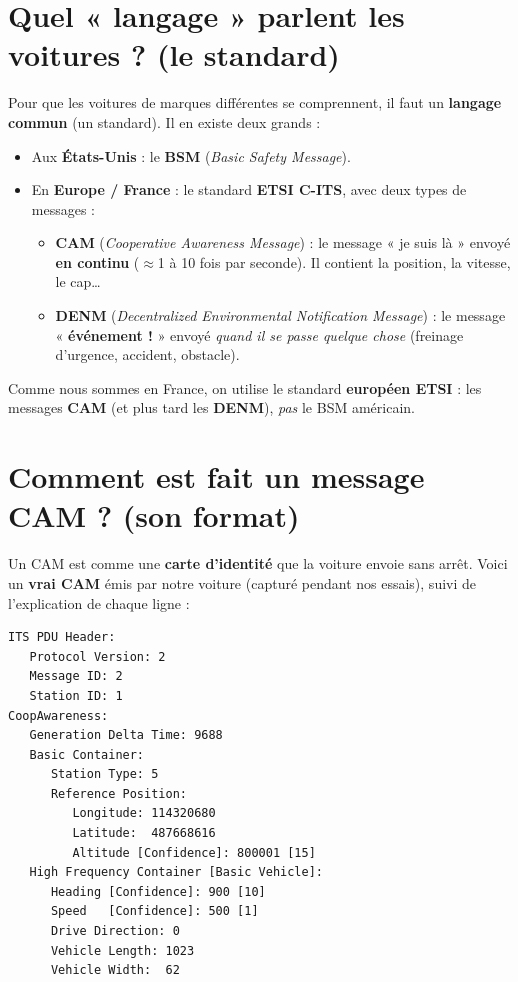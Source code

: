 \documentclass[a4paper,11pt]{article}
\begin{document}
\section{Quel « langage » parlent les voitures ? (le standard)}
Pour que les voitures de marques différentes se comprennent, il faut un
\textbf{langage commun} (un standard). Il en existe deux grands :
\begin{itemize}[leftmargin=1.4em]
  \item Aux \textbf{États-Unis} : le \textbf{BSM} (\emph{Basic Safety Message}).
  \item En \textbf{Europe / France} : le standard \textbf{ETSI C-ITS}, avec deux
        types de messages :
        \begin{itemize}[nosep]
          \item \textbf{CAM} (\emph{Cooperative Awareness Message}) : le message
                « je suis là » envoyé \textbf{en continu} ($\approx$1 à 10 fois par
                seconde). Il contient la position, la vitesse, le cap\ldots
          \item \textbf{DENM} (\emph{Decentralized Environmental Notification
                Message}) : le message « \textbf{événement !} » envoyé \emph{quand
                il se passe quelque chose} (freinage d'urgence, accident, obstacle).
        \end{itemize}
\end{itemize}

\begin{cle}
Comme nous sommes en France, on utilise le standard \textbf{européen ETSI} :
les messages \textbf{CAM} (et plus tard les \textbf{DENM}), \emph{pas} le BSM
américain.
\end{cle}

\section{Comment est fait un message CAM ? (son format)}
Un CAM est comme une \textbf{carte d'identité} que la voiture envoie sans arrêt.
Voici un \textbf{vrai CAM} émis par notre voiture (capturé pendant nos essais),
suivi de l'explication de chaque ligne :

\begin{lstlisting}
ITS PDU Header:
   Protocol Version: 2
   Message ID: 2
   Station ID: 1
CoopAwareness:
   Generation Delta Time: 9688
   Basic Container:
      Station Type: 5
      Reference Position:
         Longitude: 114320680
         Latitude:  487668616
         Altitude [Confidence]: 800001 [15]
   High Frequency Container [Basic Vehicle]:
      Heading [Confidence]: 900 [10]
      Speed   [Confidence]: 500 [1]
      Drive Direction: 0
      Vehicle Length: 1023
      Vehicle Width:  62
\end{lstlisting}
\end{document}

